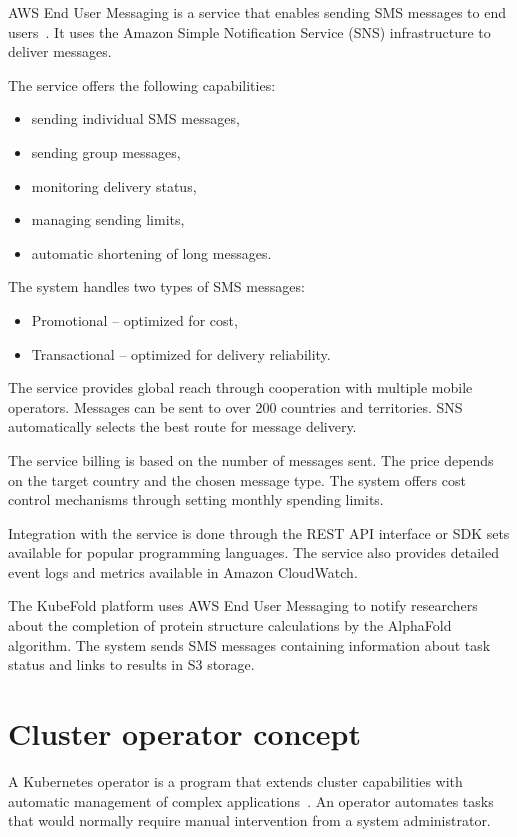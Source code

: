 AWS End User Messaging is a service that enables sending SMS messages to end users~\cite{aws_messaging}.
It uses the Amazon Simple Notification Service (SNS) infrastructure to deliver messages.

The service offers the following capabilities:
\begin{itemize}
    \item sending individual SMS messages,
    \item sending group messages,
    \item monitoring delivery status,
    \item managing sending limits,
    \item automatic shortening of long messages.
\end{itemize}

The system handles two types of SMS messages:
\begin{itemize}
    \item Promotional -- optimized for cost,
    \item Transactional -- optimized for delivery reliability.
\end{itemize}

The service provides global reach through cooperation with multiple mobile operators.
Messages can be sent to over 200 countries and territories.
SNS automatically selects the best route for message delivery.

The service billing is based on the number of messages sent.
The price depends on the target country and the chosen message type.
The system offers cost control mechanisms through setting monthly spending limits.

Integration with the service is done through the REST API interface or SDK sets available for popular programming languages.
The service also provides detailed event logs and metrics available in Amazon CloudWatch.

The KubeFold platform uses AWS End User Messaging to notify researchers about the completion of protein structure calculations by the AlphaFold algorithm.
The system sends SMS messages containing information about task status and links to results in S3 storage.


\section{Cluster operator concept}

A Kubernetes operator is a program that extends cluster capabilities with automatic management of complex applications~\cite{k8s_operators}.
An operator automates tasks that would normally require manual intervention from a system administrator.

